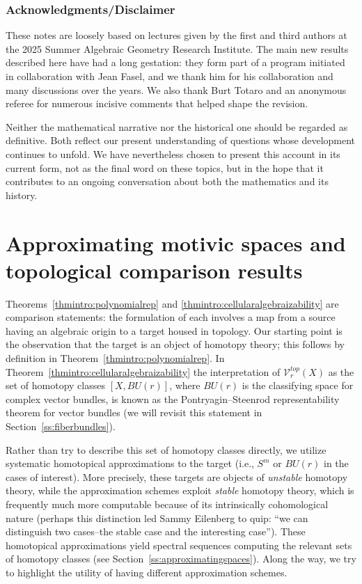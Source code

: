 \documentclass[11pt,leqno]{article}
\renewcommand{\1}{{\rm 1\hspace*{-0.4ex}%
\rule{0.1ex}{1.52ex}\hspace*{0.2ex}}}
\newcommand{\<}[1]{{\langle}#1 {\rangle}}
\newcounter{intro}
\theoremstyle{plain}
\theoremstyle{definition}
\theoremstyle{remark}
\numberwithin{equation}{subsection}
\begin{document}
\subsubsection*{Acknowledgments/Disclaimer}
These notes are loosely based on lectures given by the first and third authors at the 2025 Summer Algebraic Geometry Research Institute. The main new results described here have had a long gestation: they form part of a program initiated in collaboration with Jean Fasel, and we thank him for his collaboration and many discussions over the years. We also thank Burt Totaro and an anonymous referee for numerous incisive comments that helped shape the revision.

Neither the mathematical narrative nor the historical one should be regarded as definitive. Both reflect our present understanding of questions whose development continues to unfold. We have nevertheless chosen to present this account in its current form, not as the final word on these topics, but in the hope that it contributes to an ongoing conversation about both the mathematics and its history.



\section{Approximating motivic spaces and topological comparison results}
\label{s:mathematics}
Theorems~\ref{thmintro:polynomialrep} and \ref{thmintro:cellularalgebraizability} are comparison statements: the formulation of each involves a map from a source having an algebraic origin to a target housed in topology.  Our starting point is the observation that the target is an object of homotopy theory; this follows by definition in Theorem~\ref{thmintro:polynomialrep}.  In Theorem~\ref{thmintro:cellularalgebraizability} the interpretation of $\mathscr{V}_r^{top}(X)$ as the set of homotopy classes $[X,BU(r)]$, where $BU(r)$ is the classifying space for complex vector bundles, is known as the Pontryagin--Steenrod representability theorem for vector bundles (we will revisit this statement in Section~\ref{ss:fiberbundles}).  

Rather than try to describe this set of homotopy classes directly, we utilize systematic homotopical approximations to the target (i.e., $S^m$ or $BU(r)$ in the cases of interest).  More precisely, these targets are objects of {\em unstable} homotopy theory, while the approximation schemes exploit {\em stable} homotopy theory, which is frequently much more computable because of its intrinsically cohomological nature (perhaps this distinction led Sammy Eilenberg to quip: ``we can distinguish two cases–the stable case and the interesting case'').  These homotopical approximations yield spectral sequences computing the relevant sets of homotopy classes (see Section~\ref{ss:approximatingspaces}).  Along the way, we try to highlight the utility of having different approximation schemes.  
\end{document}
